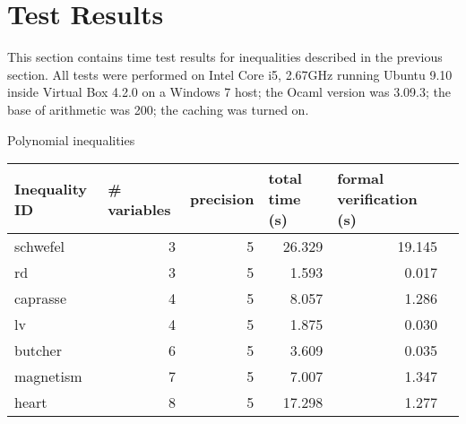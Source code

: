 \documentclass[a4paper]{article}
\begin{document}
\section{Test Results}
This section contains time test results for inequalities described in the previous section. All tests were performed on Intel Core i5, 2.67GHz running Ubuntu 9.10 inside Virtual Box 4.2.0 on a Windows 7 host; the Ocaml version was 3.09.3; the base of arithmetic was 200; the caching was turned on.

\begin{center}
Polynomial inequalities

\begin{tabular}{l@{\quad} r r r r r}
\hline
\multicolumn{1}{l}{\rule{0pt}{12pt}Inequality ID}&
\multicolumn{1}{l}{\phantom{x}\# variables}&
\multicolumn{1}{l}{\phantom{x}precision}&
\multicolumn{1}{l}{\phantom{x}total time (s)}&
\multicolumn{1}{l}{\phantom{x}formal verification (s)}\\
\hline\rule{0pt}{12pt}%
schwefel        & 3     & 5             & 26.329 &      19.145 \\
rd                      & 3 & 5         & 1.593 &       0.017 \\
caprasse        & 4 & 5         & 8.057 &       1.286 \\
lv                      & 4     & 5             & 1.875 &       0.030 \\
butcher         & 6 & 5         & 3.609 &       0.035 \\
magnetism       & 7 & 5         & 7.007 &       1.347 \\
heart           & 8 & 5         & 17.298 &      1.277 \\
\hline
\end{tabular}
\end{center}
\end{document}
